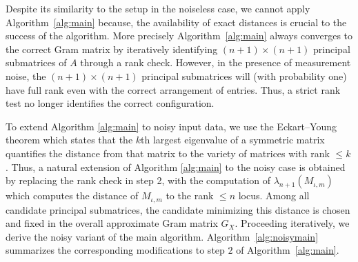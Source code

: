 \documentclass{article}
\theoremstyle{definition}
\newcommand{\ip}[2]{\langle {#1}, {#2} \rangle}
\renewcommand{\|}{|}
\begin{document}

Despite its similarity to the setup in the noiseless case, we cannot apply Algorithm~\ref{alg:main} because, the availability of exact distances is crucial to the success of the algorithm. More precisely Algorithm~\ref{alg:main} always converges to the correct Gram matrix by iteratively identifying $(n+1)\times(n+1)$ principal submatrices of $A$ through a rank check. However, in the presence of measurement noise, the $(n+1)\times(n+1)$ principal submatrices will (with probability one) have full rank even with the correct arrangement of entries. Thus, a strict rank test no longer identifies the correct configuration. 

To extend Algorithm \ref{alg:main} to noisy input data, we use the Eckart–Young theorem which states that the $k$th largest eigenvalue of a symmetric matrix quantifies the distance from that matrix to the variety of matrices with rank $\leq k$. 
Thus, a natural extension of Algorithm \ref{alg:main} to the noisy case is obtained by replacing the rank check in step 2, with the computation of $\lambda_{n+1}(M_{\iota, m})$ which computes the distance of $M_{\iota,m}$ to the rank $\leq n$ locus. Among all candidate principal submatrices, the candidate minimizing this distance is chosen and fixed in the overall approximate Gram matrix $G_X$. Proceeding iteratively, we derive the noisy variant of the main algorithm. Algorithm~\ref{alg:noisymain} summarizes the corresponding modifications to step $2$ of Algorithm~\ref{alg:main}.
\end{document}
